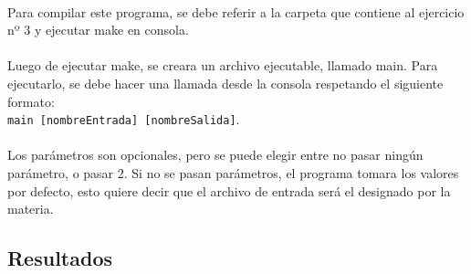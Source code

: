 \paragraph{}
Para compilar este programa, se debe referir a la carpeta que contiene al ejercicio nº 3 y ejecutar make en consola.

\paragraph{}
Luego de ejecutar make, se creara un archivo ejecutable, llamado main. Para ejecutarlo, se debe hacer una llamada desde la consola respetando el siguiente formato:\\
\texttt{main [nombreEntrada] [nombreSalida]}.

\paragraph{}
Los parámetros son opcionales, pero se puede elegir entre no pasar ningún parámetro, o pasar 2. Si no se pasan parámetros, el programa tomara los valores por defecto, esto quiere decir que el archivo de entrada será el designado por la materia.


\subsection{Resultados}
\label{resultadosej3}

